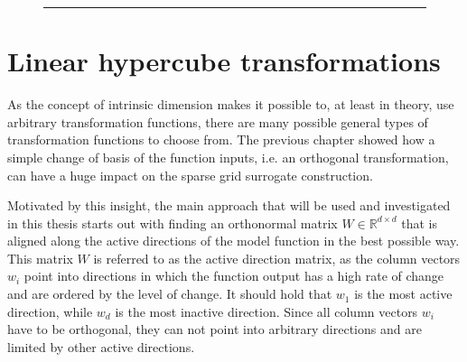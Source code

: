 \documentclass[
  a4paper,  %
  twoside,  %
  bibliography=totoc,
  headsepline,
  cleardoublepage=empty,
  parskip=half,
  draft=false
]{scrbook}
\newcommand{\delimit}{{\color{charcoal}\noindent\rule{\textwidth}{1pt}}}
\begin{document}
\newpage
\begin{mdframed}[style=style]

\vspace{2.5mm}
\begin{figure}[H]

\centering
{}

\vspace{2.5mm}
\delimit
{}
\label{fig:dim_ranges}
\end{figure}
\end{mdframed}

\section{Linear hypercube transformations}

As the concept of intrinsic dimension makes it possible to, at least in theory, use arbitrary transformation functions, there are many possible general types of transformation functions to choose from.
The previous chapter showed how a simple change of basis of the function inputs, i.e. an orthogonal transformation, can have a huge impact on the sparse grid surrogate construction.

Motivated by this insight, the main approach that will be used and investigated in this thesis starts out with finding an orthonormal matrix $W \in \mathds{R}^{d \times d}$ that is aligned along the active directions of the model function in the best possible way.
This matrix $W$ is referred to as the active direction matrix, as the column vectors $w_i$ point into directions in which the function output has a high rate of change and are ordered by the level of change.
It should hold that $w_1$ is the most active direction, while $w_d$ is the most inactive direction.
Since all column vectors $w_i$ have to be orthogonal, they can not point into arbitrary directions and are limited by other active directions.
\end{document}
